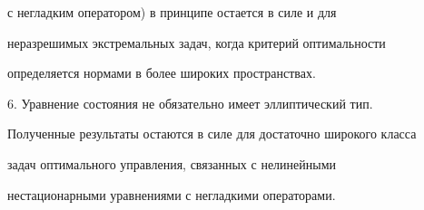с негладким оператором) в принципе остается в силе и для 


неразрешимых экстремальных задач, когда критерий оптимальности


определяется нормами в более широких пространствах. 


\smallskip 


 


6. Уравнение состояния не обязательно имеет эллиптический тип. 


Полученные результаты остаются в силе для достаточно широкого класса 


задач оптимального управления, связанных с нелинейными 


нестационарными уравнениями с негладкими операторами. 


 


 


